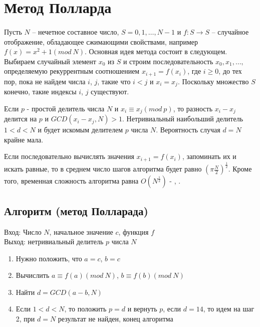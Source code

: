
\section{Метод Полларда}

\paragraph{} Пусть $N$ – нечетное составное число, $S = {0, 1, \dots, N - 1}$ и $f:S \rightarrow S$ – случайное отображение, 
обладающее сжимающими свойствами, например $f(x)=x^{ 2} + 1(mod \: N)$. Основная идея метода состоит в следующем. Выбираем случайный 
элемент $x_{0}$ из $S$ и строим последовательность $ {x_{0}, x_{1}, \dots, } $
определяемую рекуррентным соотношением $x_{i+1}=f(x_{i})$, где $i \ge 0$, до тех пор, пока не 
найдем числа $i$, $j$, такие что $i < j$ и $x_{i} = x_{j}$. Поскольку множество $S$ 
конечно, такие индексы $i$, $j$ существуют.

  Если $p$ - простой делитель числа $N$ и $x_{i} \equiv x_{j}(mod \: p)$, то разность
$x_{i} - x_{j}$ делится на $p$ и $GCD(x_{i} - x_{j}, N) > 1$. Нетривиальный 
наибольший делитель $1 < d < N$ и будет искомым делителем $p$ числа $N$. Вероятность случая $d = N$ крайне мала.

  Если последовательно вычислять значения $x_{i+1}=f(x_{i})$, запоминать их и искать равные, то в среднем число шагов 
алгоритма будет равно $( \pi \frac{N}{2})^{ \frac{1}{2}}$. Кроме того, временная сложность алгоритма равна
$O(N^{ \frac{1}{2}})$ - \cite[Глава 2.2, страницы 54-60]{ish11}, \cite[Глава 2.4, страницы 61-65]{ish11}.

  \subsection{Алгоритм (метод Полларада)}
  
  Вход: Число $N$, начальное значение $c$, функция $f$  \\
  Выход: нетривиальный делитель $p$ числа $N$
  
    \begin{enumerate}
     \item Нужно положить, что $a = c$, $b = c$
     \item Вычислить $a \equiv f(a)(mod \: N)$, $b \equiv f(b)(mod \: N)$
     \item Найти $d = GCD(a - b, N)$
     \item Если $1 < d < N$, то положить $p = d$ и вернуть $p$, если $d = 14$, то идем на шаг 2, при $d = N$ 
	результат не найден, конец алгоритма
    \end{enumerate}
  
